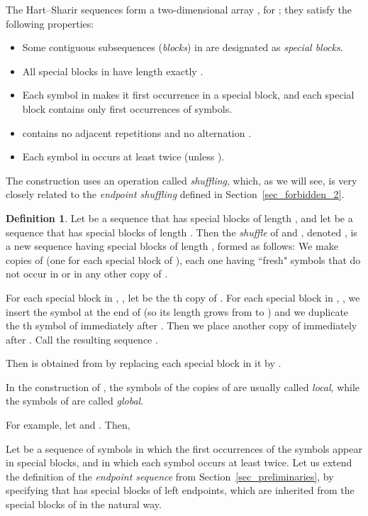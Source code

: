 \documentclass[11pt]{article}
\theoremstyle{definition}
\newtheorem{definition}[theorem]{Definition}
\theoremstyle{remark}
\begin{document}
The Hart--Sharir sequences form a two-dimensional array , for ; they satisfy the following properties:
\begin{itemize}
\item Some contiguous subsequences (\emph{blocks}) in  are designated as \emph{special blocks}.
\item All special blocks in  have length exactly .
\item Each symbol in  makes it first occurrence in a special block, and each special block contains only first occurrences of symbols.
\item  contains no adjacent repetitions and no alternation .
\item Each symbol in  occurs at least twice (unless ).
\end{itemize}

The construction uses an operation called \emph{shuffling}, which, as we will see, is very closely related to the \emph{endpoint shuffling} defined in Section~\ref{sec_forbidden_2}.

\begin{definition}
Let  be a sequence that has  special blocks of length , and let  be a sequence that has  special blocks of length . Then the \emph{shuffle} of  and , denoted , is a new sequence having  special blocks of length , formed as follows: We make  copies of  (one for each special block of ), each one having ``fresh" symbols that do not occur in  or in any other copy of .

For each special block  in , , let  be the th copy of . For each special block  in , , we insert the symbol  at the end of  (so its length grows from  to ) and we duplicate the th symbol of  immediately after . Then we place another copy of  immediately after . Call the resulting sequence .

Then  is obtained from  by replacing each special block  in it by .
\end{definition}

In the construction of , the symbols of the copies of  are usually called \emph{local}, while the symbols of  are called \emph{global}.

For example, let  and . Then,


Let  be a sequence of symbols in which the first occurrences of the symbols appear in special blocks, and in which each symbol occurs at least twice. Let us extend the definition of the \emph{endpoint sequence}  from Section~\ref{sec_preliminaries}, by specifying that  has special blocks of left endpoints, which are inherited from the special blocks of  in the natural way.
\end{document}
